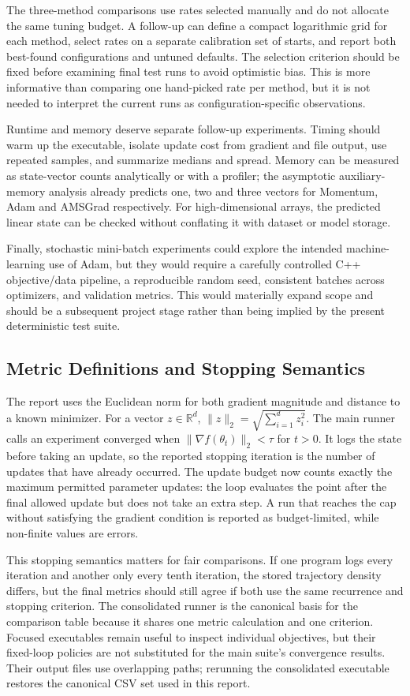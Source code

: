 ﻿\documentclass[conference]{IEEEtran}
\begin{document}
The three-method comparisons use rates selected manually and do not allocate the same tuning budget. A follow-up can define a compact logarithmic grid for each method, select rates on a separate calibration set of starts, and report both best-found configurations and untuned defaults. The selection criterion should be fixed before examining final test runs to avoid optimistic bias. This is more informative than comparing one hand-picked rate per method, but it is not needed to interpret the current runs as configuration-specific observations.

Runtime and memory deserve separate follow-up experiments. Timing should warm up the executable, isolate update cost from gradient and file output, use repeated samples, and summarize medians and spread. Memory can be measured as state-vector counts analytically or with a profiler; the asymptotic auxiliary-memory analysis already predicts one, two and three vectors for Momentum, Adam and AMSGrad respectively. For high-dimensional arrays, the predicted linear state can be checked without conflating it with dataset or model storage.

Finally, stochastic mini-batch experiments could explore the intended machine-learning use of Adam, but they would require a carefully controlled C++ objective/data pipeline, a reproducible random seed, consistent batches across optimizers, and validation metrics. This would materially expand scope and should be a subsequent project stage rather than being implied by the present deterministic test suite.

\subsection{Metric Definitions and Stopping Semantics}
The report uses the Euclidean norm for both gradient magnitude and distance to a known minimizer. For a vector $z\in\mathbb{R}^d$, $\|z\|_2=\sqrt{\sum_{i=1}^d z_i^2}$. The main runner calls an experiment converged when $\|\nabla f(\theta_t)\|_2<\tau$ for $t>0$. It logs the state before taking an update, so the reported stopping iteration is the number of updates that have already occurred. The update budget now counts exactly the maximum permitted parameter updates: the loop evaluates the point after the final allowed update but does not take an extra step. A run that reaches the cap without satisfying the gradient condition is reported as budget-limited, while non-finite values are errors.

This stopping semantics matters for fair comparisons. If one program logs every iteration and another only every tenth iteration, the stored trajectory density differs, but the final metrics should still agree if both use the same recurrence and stopping criterion. The consolidated runner is the canonical basis for the comparison table because it shares one metric calculation and one criterion. Focused executables remain useful to inspect individual objectives, but their fixed-loop policies are not substituted for the main suite's convergence results. Their output files use overlapping paths; rerunning the consolidated executable restores the canonical CSV set used in this report.
\end{document}
